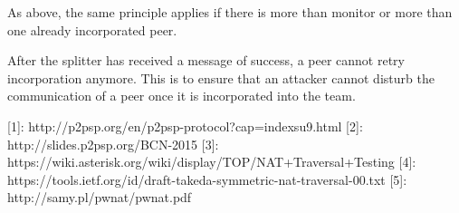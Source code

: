 \documentclass{article}
\begin{document}
As above, the same principle applies if there is more than monitor or
more than one already incorporated peer.

After the splitter has received a message of success, a peer cannot
retry incorporation anymore. This is to ensure that an attacker cannot
disturb the communication of a peer once it is incorporated into the
team.

[1]: http://p2psp.org/en/p2psp-protocol?cap=indexsu9.html
[2]: http://slides.p2psp.org/BCN-2015
[3]: https://wiki.asterisk.org/wiki/display/TOP/NAT+Traversal+Testing
[4]: https://tools.ietf.org/id/draft-takeda-symmetric-nat-traversal-00.txt
[5]: http://samy.pl/pwnat/pwnat.pdf
\end{document}
